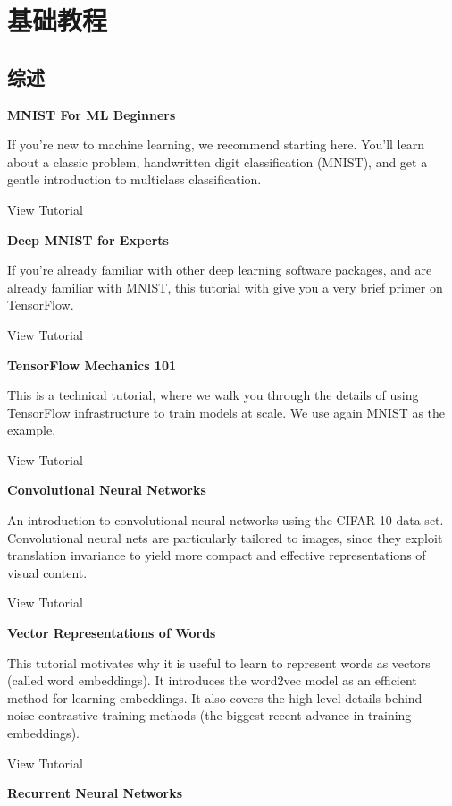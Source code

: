 


\chapter{基础教程}

\section{综述}

\textbf{MNIST For ML Beginners}

If you're new to machine learning, we recommend starting here. You'll learn about a classic problem, handwritten digit classification (MNIST), and get a gentle introduction to multiclass classification.

View Tutorial

\textbf{Deep MNIST for Experts}

If you're already familiar with other deep learning software packages, and are already familiar with MNIST, this tutorial with give you a very brief primer on TensorFlow.

View Tutorial

\textbf{TensorFlow Mechanics 101}

This is a technical tutorial, where we walk you through the details of using TensorFlow infrastructure to train models at scale. We use again MNIST as the example.

View Tutorial

\textbf{Convolutional Neural Networks}

An introduction to convolutional neural networks using the CIFAR-10 data set. Convolutional neural nets are particularly tailored to images, since they exploit translation invariance to yield more compact and effective representations of visual content.

View Tutorial

\textbf{Vector Representations of Words}

This tutorial motivates why it is useful to learn to represent words as vectors (called word embeddings). It introduces the word2vec model as an efficient method for learning embeddings. It also covers the high-level details behind noise-contrastive training methods (the biggest recent advance in training embeddings).

View Tutorial

\textbf{Recurrent Neural Networks}

